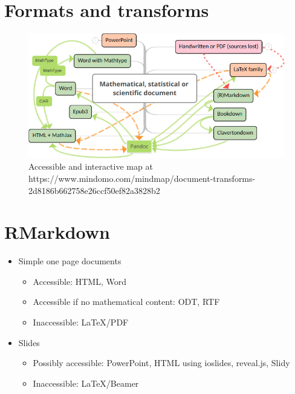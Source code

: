 \documentclass[
  10pt,
  a4paper]{article}
\providecommand{\tightlist}{%
  \setlength{\itemsep}{0pt}\setlength{\parskip}{0pt}}
\begin{document}
\hypertarget{formats-and-transforms}{%
\section{Formats and transforms}\label{formats-and-transforms}}

\begin{figure}
\includegraphics[width=1\linewidth]{map} \caption{Accessible and interactive map at https://www.mindomo.com/mindmap/document-transforms-2d8186b662758e26ccf50ef82a3828b2}\label{fig:unnamed-chunk-1}
\end{figure}

\hypertarget{rmarkdown}{%
\section{RMarkdown}\label{rmarkdown}}

\begin{itemize}
\tightlist
\item
  Simple one page documents

  \begin{itemize}
  \tightlist
  \item
    Accessible: HTML, Word
  \item
    Accessible if no mathematical content: ODT, RTF
  \item
    Inaccessible: LaTeX/PDF
  \end{itemize}
\item
  Slides

  \begin{itemize}
  \tightlist
  \item
    Possibly accessible: PowerPoint, HTML using ioslides, reveal.js, Slidy
  \item
    Inaccessible: LaTeX/Beamer
  \end{itemize}
\end{itemize}
\end{document}
